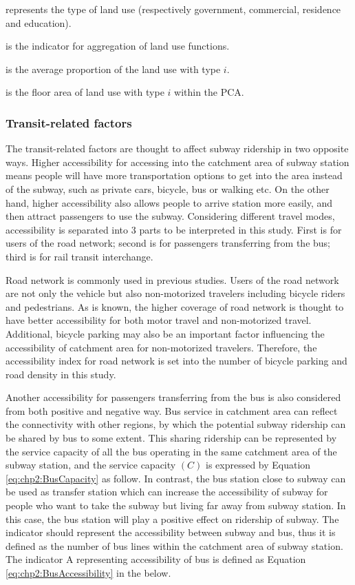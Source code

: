 \begin{description}
	\normalsize
	\item[\textbf{Where:}]
	\item[$i$] represents the type of land use (respectively government, commercial, residence and education).
	\item[$A$] is the indicator for aggregation of land use functions.
	\item[$P_i$] is the average proportion of the land use with type $i$.
	\item[$L_i$] is the floor area of land use with type $i$ within the PCA.
\end{description}

\subsubsection{Transit-related factors}
%
The transit-related factors are thought to affect subway ridership in two opposite ways. Higher accessibility for accessing into the catchment area of subway station means people will have more transportation options to get into the area instead of the subway, such as private cars, bicycle, bus or walking etc. On the other hand, higher accessibility also allows people to arrive station more easily, and then attract passengers to use the subway. Considering different travel modes, accessibility is separated into 3 parts to be interpreted in this study. First is for users of the road network; second is for passengers transferring from the bus; third is for rail transit interchange.

%
Road network is commonly used in previous studies. Users of the road network are not only the vehicle but also non-motorized travelers including bicycle riders and pedestrians. As is known, the higher coverage of road network is thought to have better accessibility for both motor travel and non-motorized travel. Additional, bicycle parking may also be an important factor influencing the accessibility of catchment area for non-motorized travelers. Therefore, the accessibility index for road network is set into the number of bicycle parking and road density in this study.

%
Another accessibility for passengers transferring from the bus is also considered from both positive and negative way. Bus service in catchment area can reflect the connectivity with other regions, by which the potential subway ridership can be shared by bus to some extent. This sharing ridership can be represented by the service capacity of all the bus operating in the same catchment area of the subway station, and the service capacity $(C)$ is expressed by Equation \ref{eq:chp2:BusCapacity} as follow. In contrast, the bus station close to subway can be used as transfer station which can increase the accessibility of subway for people who want to take the subway but living far away from subway station. In this case, the bus station will play a positive effect on ridership of subway. The indicator should represent the accessibility between subway and bus, thus it is defined as the number of bus lines within the catchment area of subway station. The indicator A representing accessibility of bus is defined as Equation \ref{eq:chp2:BusAccessibility} in the below.

